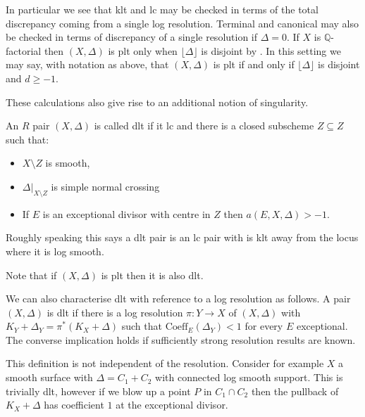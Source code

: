 \documentclass[a4paper,12pt]{book}
\begin{document}
In particular we see that klt and lc may be checked in terms of the total discrepancy coming from a single log resolution. Terminal and canonical may also be checked in terms of discrepancy of a single resolution if $\Delta=0$. If $X$ is $\mathbb{Q}$-factorial then $(X,\Delta)$ is plt only when $\lfloor \Delta \rfloor$ is disjoint by \cite[Lemma 2.28]{bhatt2020}. In this setting we may say, with notation as above, that $(X,\Delta)$ is plt if and only if $\lfloor \Delta \rfloor$ is disjoint and $d \geq -1$.


These calculations also give rise to an additional notion of singularity.

\begin{definition}
	An $R$ pair $(X,\Delta)$ is called dlt if it lc and there is a closed subscheme $Z \subseteq Z$ such that:
	
	\begin{itemize}
		\item $X\setminus Z$ is smooth, 
		\item $\Delta|_{X\setminus Z}$ is simple normal crossing
		\item If $E$ is an exceptional divisor with centre in $Z$ then $a(E,X,\Delta) > -1$.
	\end{itemize}
	
	
	 
\end{definition}

Roughly speaking this says a dlt pair is an lc pair with is klt away from the locus where it is log smooth.

Note that if $(X,\Delta)$ is plt then it is also dlt. 

\begin{remark}
	
	We can also characterise dlt with reference to a log resolution as follows. A pair $(X,\Delta)$ is dlt if there is a log resolution $\pi:Y \to X$ of $(X,\Delta)$ with $K_{Y}+\Delta_{Y}=\pi^{*}(K_{X}+\Delta)$ such that $\text{Coeff}_{E}(\Delta_{Y}) < 1$ for every $E$ exceptional. The converse implication holds if sufficiently strong resolution results are known. 
	
	This definition is not independent of the resolution. Consider for example $X$ a smooth surface with $\Delta=C_{1}+C_{2}$ with connected log smooth support. This is trivially dlt, however if we blow up a point $P$ in $C_{1}\cap C_{2}$ then the pullback of $K_{X}+\Delta$ has coefficient $1$ at the exceptional divisor.

\end{remark}
\end{document}
